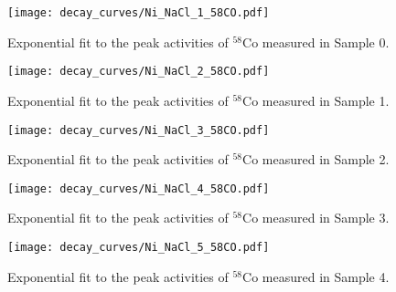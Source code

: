 \begin{figure}[htb]
\texttt{[image: decay\_curves/Ni\_NaCl\_1\_58CO.pdf]}
\caption{Exponential fit to the peak activities of $^{58}$Co measured in Sample 0.
}
\label{fig:Ni_NaCl_1_58CO}
\end{figure}

\begin{figure}[htb]
\texttt{[image: decay\_curves/Ni\_NaCl\_2\_58CO.pdf]}
\caption{Exponential fit to the peak activities of $^{58}$Co measured in Sample 1.
}
\label{fig:Ni_NaCl_2_58CO}
\end{figure}

\begin{figure}[htb]
\texttt{[image: decay\_curves/Ni\_NaCl\_3\_58CO.pdf]}
\caption{Exponential fit to the peak activities of $^{58}$Co measured in Sample 2.
}
\label{fig:Ni_NaCl_3_58CO}
\end{figure}

\begin{figure}[htb]
\texttt{[image: decay\_curves/Ni\_NaCl\_4\_58CO.pdf]}
\caption{Exponential fit to the peak activities of $^{58}$Co measured in Sample 3.
}
\label{fig:Ni_NaCl_4_58CO}
\end{figure}

\begin{figure}[htb]
\texttt{[image: decay\_curves/Ni\_NaCl\_5\_58CO.pdf]}
\caption{Exponential fit to the peak activities of $^{58}$Co measured in Sample 4.
}
\label{fig:Ni_NaCl_5_58CO}
\end{figure}

